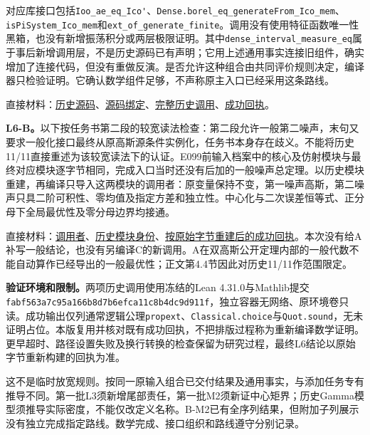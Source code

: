 对应库接口包括\nolinkurl{Ioo_ae_eq_Ico'}、\nolinkurl{Dense.borel_eq_generateFrom_Ico_mem}、\nolinkurl{isPiSystem_Ico_mem}和\nolinkurl{ext_of_generate_finite}。调用没有使用特征函数唯一性黑箱，也没有新增振荡积分或两层极限证明。其中\nolinkurl{dense_interval_measure_eq}属于事后新增调用层，不是历史源码已有声明；它用上述通用事实连接旧组件，确实增加了连接代码，但没有重做反演。是否允许这种组合由共同评价规则决定，编译器只检验证明。它确认数学组件足够，不声称原主入口已经采用这条路线。

直接材料：\href{research/analysis_20260915/final_research_supplement_20260915/evidence/H1_before_E468.lean}{历史源码}、\href{research/analysis_20260915/final_research_supplement_20260915/checks/H1_source_binding.json}{源码绑定}、\href{research/analysis_20260915/final_research_supplement_20260915/checks/H1_historical_caller.lean}{完整历史调用}、\href{research/analysis_20260915/final_research_supplement_20260915/checks/h1_historical_caller.json}{成功回执}。

\textbf{L6-B。}以下按任务书第二段的较宽读法检查：第二段允许一般第二噪声，末句又要求一般化接口最终从原高斯源条件实例化，任务书本身存在歧义。不能将历史11/11直接重述为该较宽读法下的认证。E099前输入档案中的核心及仿射模块与最终对应模块逐字节相同，完成入口当时还没有后加的一般噪声总定理。以历史模块重建，再编译只导入这两模块的调用者：原变量保持不变，第一噪声高斯，第二噪声只具二阶可积性、零均值及指定方差和独立性。中心化与二次误差恒等式、正分母下全局最优性及零分母边界均接通。

直接材料：\href{research/analysis_20260915/final_research_supplement_20260915/checks/L6_B_composition.lean}{调用者}、\href{research/analysis_20260915/final_research_supplement_20260915/checks/L6_source_binding.json}{历史模块身份}、\href{research/analysis_20260915/final_research_supplement_20260915/checks/l6_historical_rebuild_exact_bytes.json}{按原始字节重建后的成功回执}。本次没有给A补写一般结论，也没有另编译C的新调用。A在双高斯公开定理内部的一般代数不能自动算作已经导出的一般最优性；正文第4.4节因此对历史11/11作范围限定。

\textbf{验证环境和限制。}两项历史调用使用冻结的Lean 4.31.0与Mathlib提交\nolinkurl{fabf563a7c95a166b8d7b6efca11c8b4dc9d911f}，独立容器无网络、原环境卷只读。成功输出仅列通常逻辑公理\nolinkurl{propext}、\nolinkurl{Classical.choice}与\nolinkurl{Quot.sound}，无未证明占位。本版复用并核对既有成功回执，不把排版过程称为重新编译数学证明。更早超时、路径设置失败及换行转换的检查保留为研究过程，最终L6结论以原始字节重新构建的回执为准。

这不是临时放宽规则。按同一原输入组合已交付结果及通用事实，与添加任务专有推导不同。第一批L3须新增尾部责任，第一批M2须新证中心矩界；历史Gamma模型须推导实际密度，不能仅改定义名称。B-M2已有全序列结果，但附加子列展示没有独立完成指定路线。数学完成、接口组织和路线遵守分别记录。

